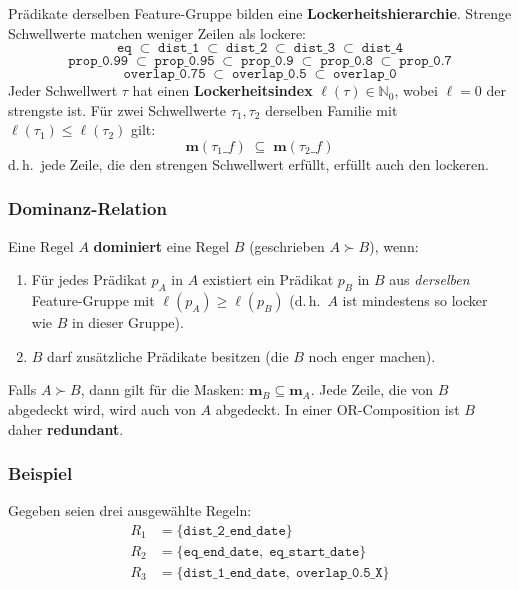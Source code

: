 \documentclass[11pt,a4paper]{article}
\begin{document}
Pr\"adikate derselben Feature-Gruppe bilden eine \textbf{Lockerheitshierarchie}. Strenge Schwellwerte matchen weniger Zeilen als lockere:
\[
  \texttt{eq} \;\subset\; \texttt{dist\_1} \;\subset\; \texttt{dist\_2} \;\subset\; \texttt{dist\_3} \;\subset\; \texttt{dist\_4}
\]
\[
  \texttt{prop\_0.99} \;\subset\; \texttt{prop\_0.95} \;\subset\; \texttt{prop\_0.9} \;\subset\; \texttt{prop\_0.8} \;\subset\; \texttt{prop\_0.7}
\]
\[
  \texttt{overlap\_0.75} \;\subset\; \texttt{overlap\_0.5} \;\subset\; \texttt{overlap\_0}
\]
Jeder Schwellwert $\tau$ hat einen \textbf{Lockerheitsindex} $\ell(\tau) \in \mathbb{N}_0$, wobei $\ell = 0$ der strengste ist. F\"ur zwei Schwellwerte $\tau_1, \tau_2$ derselben Familie mit $\ell(\tau_1) \leq \ell(\tau_2)$ gilt:
\[
  \mathbf{m}(\tau_1\_f) \;\subseteq\; \mathbf{m}(\tau_2\_f)
\]
d.\,h.\ jede Zeile, die den strengen Schwellwert erf\"ullt, erf\"ullt auch den lockeren.

\subsubsection{Dominanz-Relation}

Eine Regel $A$ \textbf{dominiert} eine Regel $B$ (geschrieben $A \succ B$), wenn:
\begin{enumerate}[nosep]
  \item F\"ur jedes Pr\"adikat $p_A$ in $A$ existiert ein Pr\"adikat $p_B$ in $B$ aus \emph{derselben} Feature-Gruppe mit $\ell(p_A) \geq \ell(p_B)$ (d.\,h.\ $A$ ist mindestens so locker wie $B$ in dieser Gruppe).
  \item $B$ darf zus\"atzliche Pr\"adikate besitzen (die $B$ noch enger machen).
\end{enumerate}

\noindent Falls $A \succ B$, dann gilt f\"ur die Masken: $\mathbf{m}_B \subseteq \mathbf{m}_A$. Jede Zeile, die von $B$ abgedeckt wird, wird auch von $A$ abgedeckt. In einer OR-Composition ist $B$ daher \textbf{redundant}.

\subsubsection{Beispiel}

Gegeben seien drei ausgew\"ahlte Regeln:
\begin{align*}
  R_1 &= \{\texttt{dist\_2\_end\_date}\} \\
  R_2 &= \{\texttt{eq\_end\_date},\; \texttt{eq\_start\_date}\} \\
  R_3 &= \{\texttt{dist\_1\_end\_date},\; \texttt{overlap\_0.5\_X}\}
\end{align*}
\end{document}
